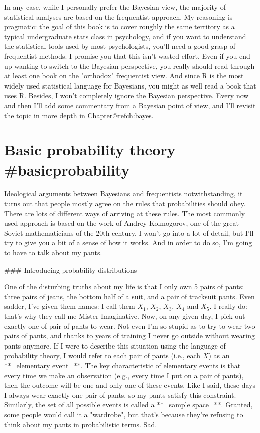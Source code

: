 In any case, while I personally prefer the Bayesian view, the majority of statistical analyses are based on the frequentist approach. My reasoning is pragmatic: the goal of this book is to cover roughly the same territory as a typical undergraduate stats class in psychology, and if you want to understand the statistical tools used by most psychologists, you'll need a good grasp of frequentist methods. I promise you that this isn't wasted effort. Even if you end up wanting to switch to the Bayesian perspective, you really should read through at least one book on the "orthodox" frequentist view. And since R is the most widely used statistical language for Bayesians, you might as well read a book that uses R. Besides, I won't completely ignore the Bayesian perspective. Every now and then I'll add some commentary from a Bayesian point of view, and I'll revisit the topic in more depth in Chapter@refch:bayes.


 
 
 
\section{Basic probability theory {#basicprobability}}

Ideological arguments between Bayesians and frequentists notwithstanding, it turns out that people mostly agree on the rules that probabilities should obey. There are lots of different ways of arriving at these rules. The most commonly used approach is based on the work of Andrey Kolmogorov, one of the great Soviet mathematicians of the 20th century. I won't go into a lot of detail, but I'll try to give you a bit of a sense of how it works. And in order to do so, I'm going to have to talk about my pants.

### Introducing probability distributions

One of the disturbing truths about my life is that I only own 5 pairs of pants: three pairs of jeans, the bottom half of a suit, and a pair of tracksuit pants. Even sadder, I've given them names: I call them $X_1$, $X_2$, $X_3$, $X_4$ and $X_5$. I really do: that's why they call me Mister Imaginative. Now, on any given day, I pick out exactly one of pair of pants to wear. Not even I'm so stupid as to try to wear two pairs of pants, and thanks to years of training I never go outside without wearing pants anymore. If I were to describe this situation using the language of probability theory, I would refer to each pair of pants (i.e., each $X$) as an **_elementary event_**. The key characteristic of elementary events is that every time we make an observation (e.g., every time I put on a pair of pants), then the outcome will be one and only one of these events. Like I said, these days I always wear exactly one pair of pants, so my pants satisfy this constraint. Similarly, the set of all possible events is called a **_sample space_**. Granted, some people would call it a "wardrobe", but that's because they're refusing to think about my pants in probabilistic terms. Sad.  

